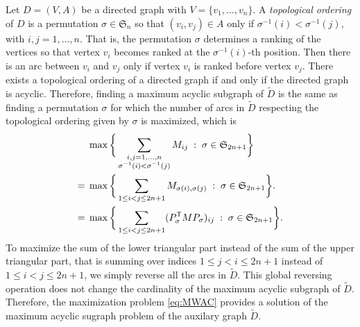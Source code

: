 \documentclass{amsart}
\newcommand{\permS}{\mathfrak{S}}
\begin{document}
Let $D = (V, A)$ be a directed graph with $V = \{v_1, \ldots,
v_n\}$. A \emph{topological ordering} of $D$ is a permutation
$\sigma \in \permS_n$ so that
$(v_{i}, v_{j}) \in A$ only if
$\sigma^{-1}(i) < \sigma^{-1}(j)$, with $i, j = 1, \ldots, n$. That
is, the permutation $\sigma$ determines a ranking of the vertices so
that vertex $v_i$ becomes ranked at the $\sigma^{-1}(i)$-th
position. Then there is an arc between $v_i$ and $v_j$ only if vertex
$v_i$ is ranked before vertex $v_j$. There exists a topological
ordering of a directed graph if and only if the directed graph is
acyclic. Therefore, finding a maximum acyclic subgraph of $\tilde{D}$
is the same as finding a permutation $\sigma$ for which the number of
arcs in $\tilde{D}$ respecting the topological ordering given by
$\sigma$ is maximized, which is
\[
  \begin{split}
&  \max\bigg\{\sum_{\substack{i,j = 1, \ldots, n\\ \sigma^{-1}(i) <
    \sigma^{-1}(j)}} M_{ij} \; : \; \sigma \in \permS_{2n+1} \bigg\}
\\
 = \; & \max\bigg\{\sum_{1 \leq i < j \leq 2n+1} M_{\sigma(i),
   \sigma(j)} \; : \; \sigma \in \permS_{2n+1} \bigg\}.\\
  = \; & \max\bigg\{\sum_{1 \leq i < j \leq 2n+1} (P_\sigma^{\sf T} M
  P_\sigma)_{ij} \; : \; \sigma \in \permS_{2n+1} \bigg\}.
 \end{split}
\]
To maximize the sum of the lower triangular part instead of the sum of
the upper triangular part, that is summing over indices
$1 \leq j < i \leq 2n+1$ instead of $1 \leq i < j \leq 2n+1$, we
simply reverse all the arcs in $\tilde{D}$.  This global reversing operation
does not change the cardinality of the maximum acyclic subgraph of
$\tilde{D}$. Therefore, the maximization problem \eqref{eq:MWAC}
provides a solution of the maximum acyclic sugraph problem of
the auxilary graph $\tilde{D}$.
\end{document}
